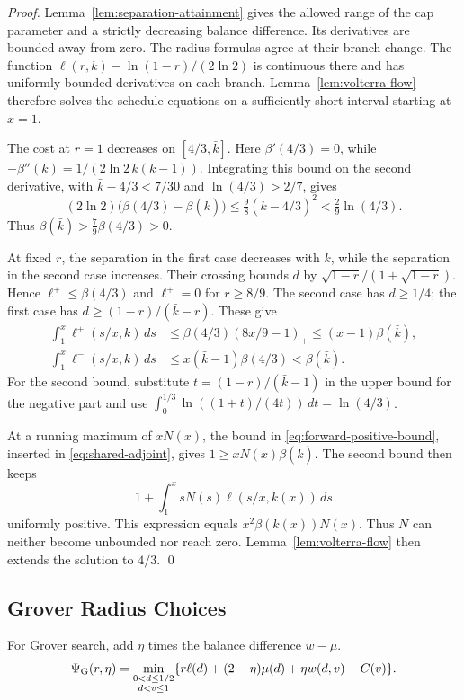 \documentclass[runningheads,envcountsame,envcountsect,orivec]{llncs}
\begin{document}
\begin{proof}
Lemma~\ref{lem:separation-attainment} gives the allowed range
of the cap parameter and a strictly decreasing balance difference.
Its derivatives are bounded away from zero. The radius formulas
agree at their branch change. The function
$\ell(r,k)-\ln(1-r)/(2\ln2)$ is continuous there and has
uniformly bounded derivatives on each branch. Lemma~\ref{lem:volterra-flow} therefore solves the
schedule equations on a sufficiently short interval starting at
$x=1$.

The cost at $r=1$ decreases on $[4/3,\bar k]$.
Here $\beta'(4/3)=0$, while
$-\beta''(k)=1/(2\ln2\,k(k-1))$.
Integrating this bound on the second derivative, with
$\bar k-4/3<7/30$ and $\ln(4/3)>2/7$, gives
\[
 (2\ln2)\bigl(\beta(4/3)-\beta(\bar k)\bigr)
 \le\tfrac98(\bar k-4/3)^2<\tfrac29\ln(4/3).
\]
Thus $\beta(\bar k)>\tfrac79\beta(4/3)>0$.

At fixed $r$, the separation in the first case decreases with
$k$, while the separation in the second case increases. Their crossing bounds $d$ by
$\sqrt{1-r}/(1+\sqrt{1-r})$.
Hence $\ell^+\le\beta(4/3)$ and $\ell^+=0$ for $r\ge8/9$.
The second case has $d\ge1/4$; the first case has
$d\ge(1-r)/(\bar k-r)$. These give
\begin{align}
 \int_1^x\ell^+(s/x,k)\,ds
 &\le\beta(4/3)(8x/9-1)_+\le(x-1)\beta(\bar k),
 \label{eq:forward-positive-bound}\\
 \int_1^x\ell^-(s/x,k)\,ds
 &\le x(\bar k-1)\beta(4/3)<\beta(\bar k).
 \label{eq:forwardbounds}
\end{align}
For the second bound, substitute $t=(1-r)/(\bar k-1)$
in the upper bound for the negative part and use
$\int_0^{1/3}\ln((1+t)/(4t))\,dt=\ln(4/3)$.

At a running maximum of $xN(x)$, the bound in
\eqref{eq:forward-positive-bound}, inserted in
\eqref{eq:shared-adjoint}, gives
$1\ge xN(x)\beta(\bar k)$.
The second bound then keeps
\[
 1+\int_1^x sN(s)\ell(s/x,k(x))\,ds
\]
uniformly positive. This expression equals
$x^2\beta(k(x))N(x)$. Thus $N$ can neither become unbounded nor reach zero.
Lemma~\ref{lem:volterra-flow} then extends the solution to $4/3$.
\qed
\end{proof}

\subsection{Grover Radius Choices}
\label{app:grover-radii}

For Grover search, add $\eta$ times the balance difference $w-\mu$.
\begin{align}
 \Psi_{\rm G}(r,\eta)
  =\min_{\substack{0<d\le1/2\\ d<v\le1}}
  \{r\ell(d)+(2-\eta)\mu(d)+\eta w(d,v)-C(v)\}.
 \label{eq:grover-local}
\end{align}
\end{document}
